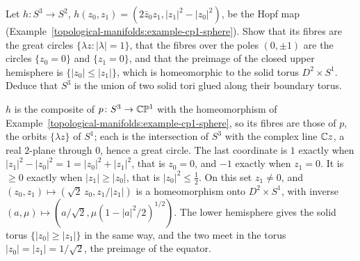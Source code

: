 \begin{exercise}\label{topological-manifolds:exercise-hopf-tori}
Let $h \colon S^3 \to S^2$, $h(z_0, z_1) = (2\bar z_0z_1, |z_1|^2 - |z_0|^2)$, be the Hopf map (Example~\ref{topological-manifolds:example-cp1-sphere}). Show that its fibres are the great circles
$\{\lambda z : |\lambda| = 1\}$, that the fibres over the poles $(0, \pm1)$ are the circles $\{z_0 = 0\}$ and $\{z_1 = 0\}$, and that the preimage of the closed upper hemisphere is $\{|z_0| \leq |z_1|\}$, which is
homeomorphic to the solid torus $D^2 \times S^1$. Deduce that $S^3$ is the union of two solid tori glued along their boundary torus.
\end{exercise}

\begin{solution}
$h$ is the composite of $p \colon S^3 \to \mathbb{C}\mathbb{P}^1$ with the homeomorphism of Example~\ref{topological-manifolds:example-cp1-sphere}, so its fibres are those of $p$, the orbits $\{\lambda z\}$ of $S^1$; each is
the intersection of $S^3$ with the complex line $\mathbb{C} z$, a real $2$-plane through $0$, hence a great circle. The last coordinate is $1$ exactly when $|z_1|^2 - |z_0|^2 = 1 = |z_0|^2 + |z_1|^2$, that is
$z_0 = 0$, and $-1$ exactly when $z_1 = 0$. It is $\geq 0$ exactly when $|z_1| \geq |z_0|$, that is $|z_0|^2 \leq \frac12$. On this set $z_1 \neq 0$, and
$(z_0, z_1) \mapsto (\sqrt2\,z_0, z_1/|z_1|)$ is a homeomorphism onto $D^2 \times S^1$, with inverse $(a, \mu) \mapsto (a/\sqrt2, \mu(1 - |a|^2/2)^{1/2})$. The lower hemisphere gives the solid torus $\{|z_0| \geq |z_1|\}$ in the
same way, and the two meet in the torus $|z_0| = |z_1| = 1/\sqrt2$, the preimage of the equator.
\end{solution}
